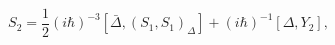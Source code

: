 \begin{equation}\label{4.13a}
S_2=\frac{1}{2}(i\hbar)^{-3}[\bar{\Delta},(S_1,S_1)_\Delta]+
(i\hbar)^{-1}[\Delta,Y_2],
\end{equation}

